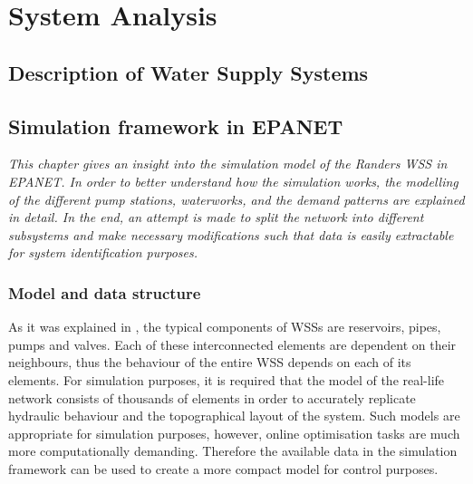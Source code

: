 
\part{System Analysis}
\label{system_analysis}

\chapter{Description of Water Supply Systems}
\label{description_of_water_supply_systems}

 





\chapter{Simulation framework in EPANET}
\label{simulation_framework_in_EPANET}

\emph{This chapter gives an insight into the simulation model of the Randers WSS in EPANET. In order to better understand how the simulation works, the modelling of the different pump stations, waterworks, and the demand patterns are explained in detail. In the end, an attempt is made to split the network into different subsystems and make necessary modifications such that data is easily extractable for system identification purposes.}


\section{Model and data structure}
\label{model_data_and_structure}

As it was explained in , the typical components of WSSs are reservoirs, pipes, pumps and valves. Each of these interconnected elements are dependent on their neighbours, thus the behaviour of the entire WSS depends on each of its elements. For simulation purposes, it is required that the model of the real-life network consists of thousands of elements in order to accurately replicate hydraulic behaviour and the topographical layout of the system. Such models are appropriate for simulation purposes, however, online optimisation tasks are much more computationally demanding. Therefore the available data in the simulation framework can be used to create a more compact model for control purposes. 

